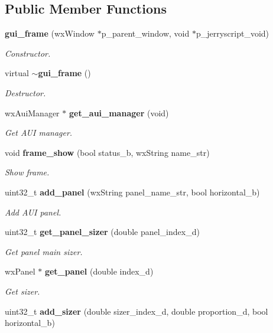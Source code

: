 \subsection*{Public Member Functions}
\begin{DoxyCompactItemize}
\item 
\textbf{ gui\+\_\+frame} (wx\+Window $\ast$p\+\_\+parent\+\_\+window, void $\ast$p\+\_\+jerryscript\+\_\+void)
\begin{DoxyCompactList}\small\item\em Constructor. \end{DoxyCompactList}\item 
virtual \textbf{ $\sim$gui\+\_\+frame} ()
\begin{DoxyCompactList}\small\item\em Destructor. \end{DoxyCompactList}\item 
wx\+Aui\+Manager $\ast$ \textbf{ get\+\_\+aui\+\_\+manager} (void)
\begin{DoxyCompactList}\small\item\em Get A\+UI manager. \end{DoxyCompactList}\item 
void \textbf{ frame\+\_\+show} (bool status\+\_\+b, wx\+String name\+\_\+str)
\begin{DoxyCompactList}\small\item\em Show frame. \end{DoxyCompactList}\item 
uint32\+\_\+t \textbf{ add\+\_\+panel} (wx\+String panel\+\_\+name\+\_\+str, bool horizontal\+\_\+b)
\begin{DoxyCompactList}\small\item\em Add A\+UI panel. \end{DoxyCompactList}\item 
uint32\+\_\+t \textbf{ get\+\_\+panel\+\_\+sizer} (double panel\+\_\+index\+\_\+d)
\begin{DoxyCompactList}\small\item\em Get panel main sizer. \end{DoxyCompactList}\item 
wx\+Panel $\ast$ \textbf{ get\+\_\+panel} (double index\+\_\+d)
\begin{DoxyCompactList}\small\item\em Get sizer. \end{DoxyCompactList}\item 
uint32\+\_\+t \textbf{ add\+\_\+sizer} (double sizer\+\_\+index\+\_\+d, double proportion\+\_\+d, bool horizontal\+\_\+b)

\end{DoxyCompactItemize}
